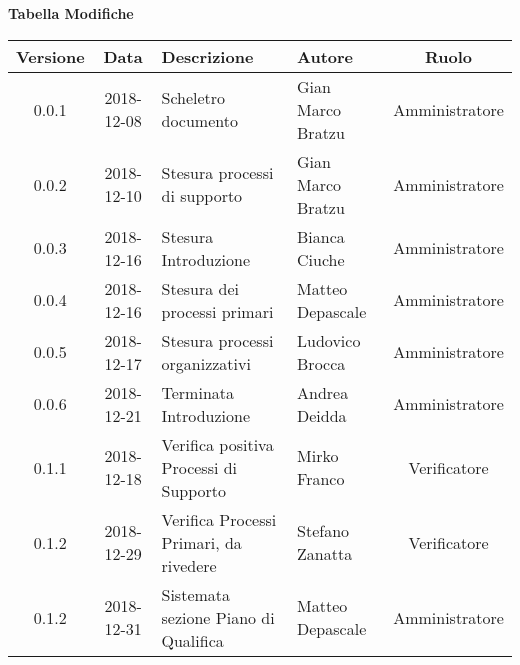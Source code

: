 \begin{center}
	\textbf{Tabella Modifiche}
	\end{center}
	\begin{center}
		\begin{tabularx}{\textwidth}{|c|c|X|X|c|}
			\hline
			\textbf{Versione} & \textbf{Data} & \textbf{Descrizione} & \textbf{Autore} & \textbf{Ruolo} \\
			\hline
			0.0.1 & 2018-12-08 & Scheletro documento  & Gian Marco Bratzu & Amministratore\\
			\hline
			0.0.2 & 2018-12-10 & Stesura processi di supporto & Gian Marco Bratzu & Amministratore\\	
			\hline
			0.0.3 & 2018-12-16 & Stesura Introduzione & Bianca Ciuche & Amministratore\\
			\hline
			0.0.4 & 2018-12-16 & Stesura dei processi primari & Matteo Depascale & Amministratore\\
			\hline
			0.0.5 & 2018-12-17 & Stesura processi organizzativi & Ludovico Brocca & Amministratore\\
			\hline
			0.0.6 & 2018-12-21 & Terminata Introduzione & Andrea Deidda & Amministratore\\
			\hline
			0.1.1 & 2018-12-18 & Verifica positiva Processi di Supporto & Mirko Franco & Verificatore\\
			\hline
			0.1.2 & 2018-12-29 & Verifica Processi Primari, da rivedere & Stefano Zanatta & Verificatore\\
			\hline
			0.1.2 & 2018-12-31 & Sistemata sezione Piano di Qualifica & Matteo Depascale & Amministratore\\
			\hline
		\end{tabularx}
	\end{center}

\newpage